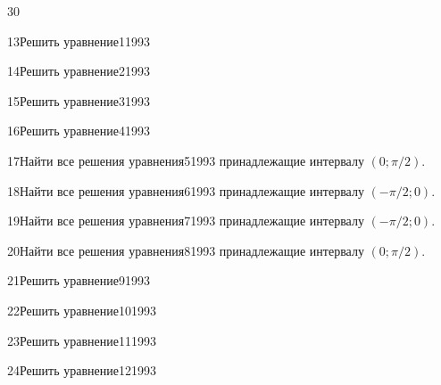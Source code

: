\begin{TrigSourcePage}{30}
\begin{TrigExercise}{13}{Решить уравнение}{1}{1993}
\end{TrigExercise}
\begin{TrigExercise}{14}{Решить уравнение}{2}{1993}
\end{TrigExercise}
\begin{TrigExercise}{15}{Решить уравнение}{3}{1993}
\end{TrigExercise}
\begin{TrigExercise}{16}{Решить уравнение}{4}{1993}
\end{TrigExercise}
\begin{TrigExercise}{17}{Найти все решения уравнения}{5}{1993}
принадлежащие интервалу $(0;\pi/2)$.
\end{TrigExercise}
\begin{TrigExercise}{18}{Найти все решения уравнения}{6}{1993}
принадлежащие интервалу $(-\pi/2;0)$.
\end{TrigExercise}
\begin{TrigExercise}{19}{Найти все решения уравнения}{7}{1993}
принадлежащие интервалу $(-\pi/2;0)$.
\end{TrigExercise}
\begin{TrigExercise}{20}{Найти все решения уравнения}{8}{1993}
принадлежащие интервалу $(0;\pi/2)$.
\end{TrigExercise}
\begin{TrigExercise}{21}{Решить уравнение}{9}{1993}
\end{TrigExercise}
\begin{TrigExercise}{22}{Решить уравнение}{10}{1993}
\end{TrigExercise}
\begin{TrigExercise}{23}{Решить уравнение}{11}{1993}
\end{TrigExercise}
\begin{TrigExercise}{24}{Решить уравнение}{12}{1993}
\end{TrigExercise}
\end{TrigSourcePage}

